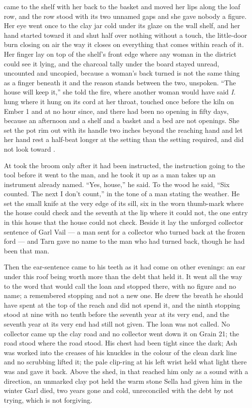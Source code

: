  came to the shelf with her back to the basket and moved her lips along the loaf row, and the row stood with its two unnamed gaps and she gave nobody a figure. Her eye went once to the clay jar cold under its glaze on the wall shelf, and her hand started toward it and shut half over nothing without a touch, the little-door burn closing on air the way it closes on everything that comes within reach of it. Her finger lay on top of the shelf's front edge where any woman in the district could see it lying, and the charcoal tally under the board stayed unread, uncounted and uncopied, because a woman's back turned is not the same thing as a finger beneath it and the reason stands between the two, unspoken. “The house will keep it,” she told the fire, where another woman would have said \emph{I}.  hung where it hung on its cord at her throat, touched once before the kiln on Ember 1 and at no hour since, and there had been no opening in fifty days, because an afternoon and a shelf and a basket and a bed are not openings. She set the pot rim out with its handle two inches beyond the reaching hand and let her hand rest a half-beat longer at the setting than the setting required, and did not look toward .

\scenebreak

At   took the broom only after it had been instructed, the instruction going to the tool before it went to the man, and he took it up as a man takes up an instrument already named. “Yes, house,” he said. To the wood he said, “Six counted. The next I don't count,” in the tone of a man stating the weather. He set the small knife at the very edge of its sill, six in the worn thumb-mark where the house could check and the seventh at the lip where it could not, the one entry in this house that the house could not check. Beside it lay the unforged collector sentence of Garl Vail --- a man sent for a collector who turned back at the frozen ford --- and Tarn gave no name to the man who had turned back, though he had been that man.

Then the ear-sentence came to his teeth as it had come on other evenings: an ear under this roof being worth more than the debt that held it. It went all the way to the word that would call the loan and stopped there, with no figure and no name; a remembered stopping and not a new one. He drew the breath he should have spent at the top of the reach and did not spend it, and the ninth stopping stood at nine with no tenth before the seventh year at its very end, and the seventh year at its very end had still not given. The loan was not called. No collector came up the clay road and no collector went down it on Grain 21; the road stood where the road stood. His chest had been tight since the dark; Ash was worked into the creases of his knuckles in the colour of the clean dark line and no scrubbing lifted it; the pale clip-ring at his left wrist held what light there was and gave it back. Above the shed, in  that reached him only as a sound with a direction, an unmarked clay pot held the warm stone Sella had given him in the winter Garl died, two years gone and cold, unreconciled with the debt by not trying, which is not forgiving.

